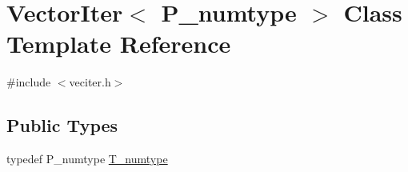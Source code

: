 \hypertarget{classVectorIter}{}\section{Vector\+Iter$<$ P\+\_\+numtype $>$ Class Template Reference}
\label{classVectorIter}


{\ttfamily \#include $<$veciter.\+h$>$}

\subsection*{Public Types}
\begin{DoxyCompactItemize}
\item 
typedef P\+\_\+numtype \hyperlink{classVectorIter_aac3a64c6fd8651eff6039cb346be1af1}{T\+\_\+numtype}
\end{DoxyCompactItemize}
